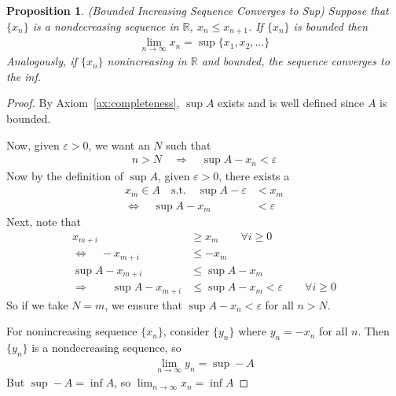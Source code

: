 \documentclass[12pt]{book}
\numberwithin{equation}{section} %
\theoremstyle{plain}
\newtheorem{prop}[thm]{Proposition}
\newtheorem{cor}[thm]{Corollary}
\theoremstyle{definition}
\theoremstyle{remark}
\newcommand{\R}{\mathbb{R}}
\begin{document}
\begin{prop}
\label{prop:increasingnonincreasing}
\emph{(Bounded Increasing Sequence Converges to Sup)}
Suppose that $\{x_n\}$ is a nondecreasing sequence in $\R$, $x_n \leq
x_{n+1}$. If $\{x_n\}$ is bounded then
\begin{align*}
  \lim_{n\rightarrow \infty} x_n = \sup \{x_1,x_2,\ldots\}
\end{align*}
Analogously, if $\{x_n\}$ nonincreasing in $\R$ and bounded,
the sequence converges to the inf.
\end{prop}
\begin{proof}
By Axiom~\ref{ax:completeness}, $\sup A$ exists and is well defined
since $A$ is bounded.

Now, given $\varepsilon>0$, we want an $N$ such that
\begin{align*}
  n>N\quad\Rightarrow\quad
  \sup A - x_n < \varepsilon
\end{align*}
Now by the definition of $\sup A$, given $\varepsilon>0$, there exists a
\begin{align*}
  x_m \in A
  \quad \text{s.t.} \quad
  \sup A - \varepsilon &< x_m\\
  \Leftrightarrow\quad
  \sup A - x_m&< \varepsilon
\end{align*}
Next, note that
\begin{align*}
  x_{m+i} &\geq x_m
  \qquad \forall i \geq 0 \\
  \Leftrightarrow\quad
  -x_{m+i} &\leq -x_m \\
  \sup A -x_{m+i} &\leq \sup A-x_m \\
  \Rightarrow \qquad
  \sup A -x_{m+i} &\leq \sup A-x_m < \varepsilon
  \qquad \forall i \geq 0
\end{align*}
So if we take $N=m$, we ensure that $\sup A - x_n< \varepsilon$ for all
$n>N$.

For nonincreasing sequence $\{x_n\}$,
consider $\{y_n\}$ where $y_n = -x_n$ for all $n$. Then $\{y_n\}$ is a
nondecreasing sequence, so
\begin{align*}
  \lim_{n\rightarrow \infty} y_n = \sup -A
\end{align*}
But $\sup -A = \inf A$, so $\lim_{n\rightarrow \infty} x_n = \inf A$
\end{proof}

\end{document}
